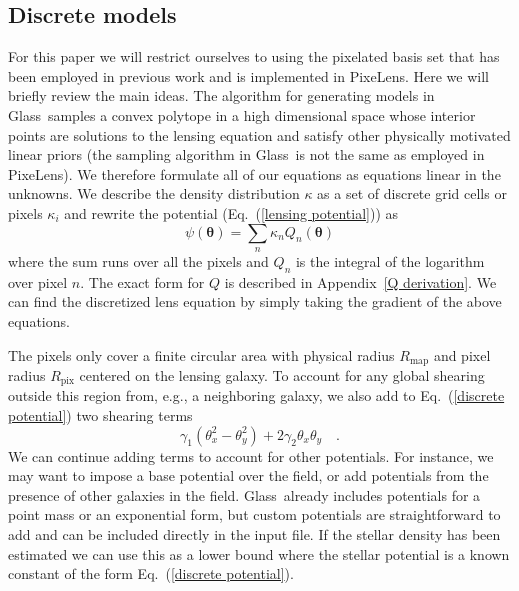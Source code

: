 \documentclass[onecolumn,galley]{mn2e}
\newcommand{\Glass}{{\sc Glass}}
\newcommand{\PixeLens}{{\sc PixeLens}}
\newcommand{\Rmap}{\ensuremath{R_\mathrm{map}}}
\newcommand{\Rpix}{\ensuremath{R_\mathrm{pix}}}
\newcommand{\eqnref}[1] {Eq.~(\ref{#1})}
\newcommand{\appref}[1] {Appendix~\ref{#1}}
\renewcommand{\vec}[1]{\ensuremath{\boldsymbol{#1}}}
\begin{document}
\subsection{Discrete models}

For this paper we will restrict ourselves to using the pixelated basis set that
has been employed in previous work and is implemented in \PixeLens. Here we
will briefly review the main ideas. The algorithm for generating models in
\Glass\ samples a convex polytope in a high dimensional space whose interior
points are solutions to the lensing equation and satisfy other physically
motivated linear priors (the sampling algorithm in \Glass\ is not the same as
employed in \PixeLens).  We therefore formulate all of our equations as
equations linear in the unknowns. We describe the density distribution $\kappa$
as a set of discrete grid cells or pixels $\kappa_i$ and rewrite the potential
(\eqnref{lensing potential}) as
%
\begin{equation}
  \psi(\vec\theta) = \sum_n \kappa_n Q_n(\vec\theta)
  \label{discrete potential}
\end{equation}
%
where the sum runs over all the pixels and $Q_n$ is the integral of the logarithm
over pixel $n$. The exact form for $Q$ is described in \appref{Q derivation}.
We can find the discretized lens equation by simply taking the gradient of the
above equations. 

The pixels only cover a finite circular area with physical radius $\Rmap$ and
pixel radius $\Rpix$ centered on the lensing galaxy. To account for any global
shearing outside this region from, e.g., a neighboring galaxy, we also add to
\eqnref{discrete potential} two shearing terms
%
\begin{equation}
\label{shear}
\gamma_1(\theta_x^2 - \theta_y^2) + 2\gamma_2\theta_x\theta_y\quad.
\end{equation}
%
We can continue adding terms to account for other potentials. For instance,
we may want to impose a base potential over the field, or add potentials
from the presence of other galaxies in the field. \Glass\
already includes potentials for a point mass or an exponential form, but custom
potentials are straightforward to add and can be included directly in the input file.
If the stellar density has been estimated we can use this as a lower bound
where the stellar potential is a known constant of the form \eqnref{discrete
potential}.

%
%
\end{document}
